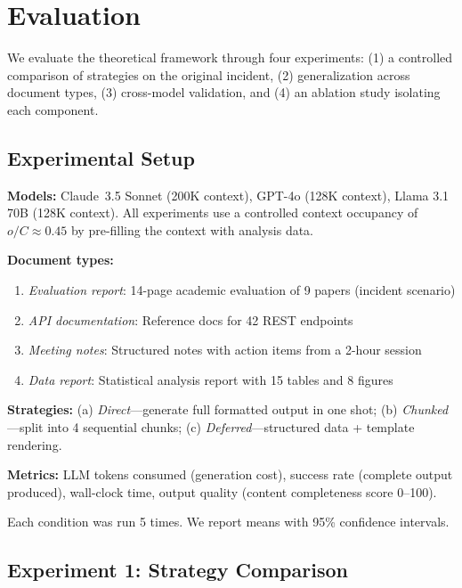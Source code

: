\documentclass[11pt,twocolumn]{article}
\begin{document}
\section{Evaluation}
\label{sec:eval}

We evaluate the theoretical framework through four experiments:
(1) a controlled comparison of strategies on the original incident,
(2) generalization across document types,
(3) cross-model validation, and
(4) an ablation study isolating each component.

\subsection{Experimental Setup}

\textbf{Models:} Claude~3.5 Sonnet (200K context),
GPT-4o (128K context), Llama 3.1 70B (128K context).
All experiments use a controlled context occupancy of $o/C \approx 0.45$
by pre-filling the context with analysis data.

\textbf{Document types:}
\begin{enumerate}[leftmargin=*,itemsep=1pt]
  \item \emph{Evaluation report}: 14-page academic evaluation of 9 papers (incident scenario)
  \item \emph{API documentation}: Reference docs for 42 REST endpoints
  \item \emph{Meeting notes}: Structured notes with action items from a 2-hour session
  \item \emph{Data report}: Statistical analysis report with 15 tables and 8 figures
\end{enumerate}

\textbf{Strategies:}
(a) \emph{Direct}---generate full formatted output in one shot;
(b) \emph{Chunked}---split into 4 sequential chunks;
(c) \emph{Deferred}---structured data + template rendering.

\textbf{Metrics:}
LLM tokens consumed (generation cost),
success rate (complete output produced),
wall-clock time,
output quality (content completeness score 0--100).

Each condition was run 5 times.  We report means with 95\%
confidence intervals.

\subsection{Experiment 1: Strategy Comparison}
\end{document}
